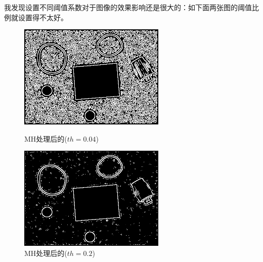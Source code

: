 \documentclass[11pt, a4paper, UTF8]{ctexart}
\begin{document}
我发现设置不同阈值系数对于图像的效果影响还是很大的：如下面两张图的阈值比例就设置得不太好。

\begin{figure}[H]
  \centering
  \begin{minipage}[t]{0.48\textwidth}
  \centering
  \includegraphics[width=7cm]{MH_alpha=0.04_rubberband_cap.png}
  \caption{MH处理后的($th=0.04$)}
  \end{minipage}
  \begin{minipage}[t]{0.48\textwidth}
  \centering
  \includegraphics[width=7cm]{MH_alpha=0.2_rubberband_cap.png}
  \caption{MH处理后的($th=0.2$)}
  \end{minipage}
\end{figure}
\end{document}
